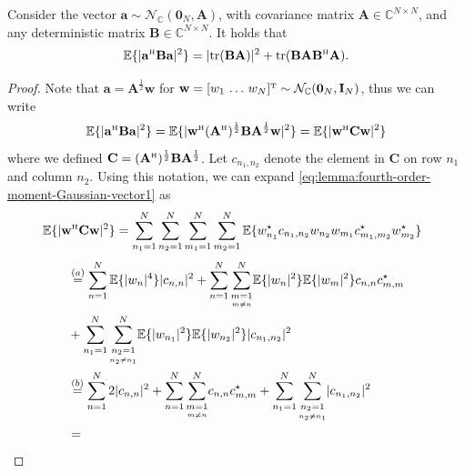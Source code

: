 \documentclass[SIG,biber]{nowfnt}
\newcommand{\vect}[1]{\mathbf{#1}}
\newcommand{\condSum}[3]{\overset{#3}{\underset{\underset{#2}{#1}}{\sum}}}
\def\tr{\mathrm{tr}}
\def\Htran{\mbox{\tiny $\mathrm{H}$}}
\def\Ttran{\mbox{\tiny $\mathrm{T}$}}
\def\CN{\mathcal{N}_{\mathbb{C}}}
\begin{document}
\begin{lemma} \label{lemma:fourth-order-moment-Gaussian-vector}
Consider the vector $\vect{a} \sim \CN(\vect{0}_{N}, \vect{A} )$, with covariance matrix $\vect{A} \in \mathbb{C}^{N \times N}$, and any deterministic matrix $\vect{B} \in \mathbb{C}^{N \times N}$. It holds that
\begin{equation} \label{eq:lemma:fourth-order-moment-Gaussian-vector}
\mathbb{E}\{ | \vect{a}^{\Htran}  \vect{B} \vect{a} |^2  \} =  |\tr( \vect{B} \vect{A} ) |^2 + \tr( \vect{B} \vect{A} \vect{B}^{\Htran} \vect{A} ) .
\end{equation}
\end{lemma}
\begin{proof}
Note that $\vect{a} = \vect{A}^{\frac12} \vect{w}$ for $\vect{w} = [w_1 \, \ldots \, w_N]^{\Ttran} \sim \CN(\vect{0}_{N}, \vect{I}_N )$, thus we can write 
\begin{equation} \label{eq:lemma:fourth-order-moment-Gaussian-vector1}
\mathbb{E}\{ | \vect{a}^{\Htran}  \vect{B} \vect{a} |^2  \} = \mathbb{E}\{ | \vect{w}^{\Htran} (\vect{A}^{\Htran})^{\frac12}  \vect{B} \vect{A}^{\frac12}  \vect{w} |^2  \} = \mathbb{E}\{ | \vect{w}^{\Htran} \vect{C} \vect{w} |^2  \}
\end{equation}
where we defined  $\vect{C} = (\vect{A}^{\Htran})^{\frac12}  \vect{B} \vect{A}^{\frac12}$. Let $c_{n_1,n_2}$ denote the element in $\vect{C}$ on row $n_1$ and column $n_2$.
Using this notation, we can expand \eqref{eq:lemma:fourth-order-moment-Gaussian-vector1} as
\begin{align} \
\notag &\mathbb{E}\{ | \vect{w}^{\Htran} \vect{C} \vect{w} |^2  \} = \sum_{n_1=1}^{N} \sum_{n_2=1}^{N} \sum_{m_1=1}^{N} \sum_{m_2=1}^{N} \mathbb{E}\{
w_{n_1}^{\star} c_{n_1,n_2} w_{n_2}w_{m_1} c_{m_1,m_2}^{\star} w_{m_2}^{\star} \} 
\end{align}
\begin{align}
&\overset{(a)}{=}  \sum_{n=1}^{N} \mathbb{E}\{
|w_{n}|^4  \} |c_{n,n}|^2
+
\sum_{n=1}^{N}
\condSum{m=1}{m \neq n}{N}
  \mathbb{E}\{
|w_{n}|^2 \} \mathbb{E}\{ |w_{m}|^2  \} c_{n,n} c_{m,m}^{\star} 
\notag \\ &+
\sum_{n_1=1}^{N}
\condSum{n_2=1}{n_2 \neq n_1}{N} \mathbb{E}\{
|w_{n_1}|^2 \} \mathbb{E}\{ |w_{n_2} |^2 \} |c_{n_1,n_2}|^2
\notag \\ & \overset{(b)}{=}  \sum_{n=1}^{N} 2 |c_{n,n}|^2
+
\sum_{n=1}^{N}
\condSum{m=1}{m \neq n}{N}
 c_{n,n} c_{m,m}^{\star} +
\sum_{n_1=1}^{N}
\condSum{n_2=1}{n_2 \neq n_1}{N}  |c_{n_1,n_2}|^2
\notag \\ & =

\end{align}
\end{proof}
\end{document}
